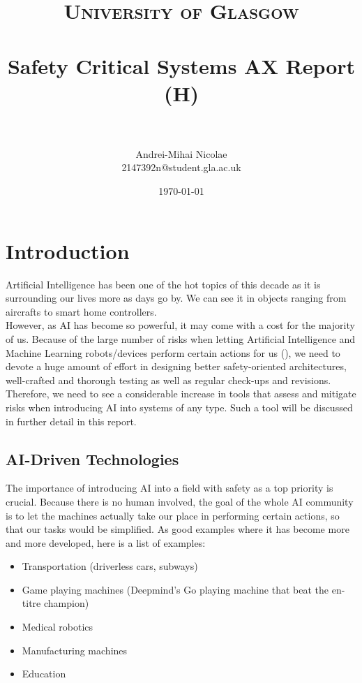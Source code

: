 \documentclass[paper=a4, fontsize=11pt]{scrartcl} %
\title{
\normalfont \normalsize
\textsc{University of Glasgow} \\ [25pt] 
\horrule{0.5pt} \\[0.4cm] %
\huge Safety Critical Systems AX Report (H)\\ 
\horrule{2pt} \\[0.5cm] %
}
\author{Andrei-Mihai Nicolae\\2147392n@student.gla.ac.uk} %
\date{\normalsize\today} %
\numberwithin{equation}{section} %
\numberwithin{figure}{section} %
\numberwithin{table}{section} %
\begin{document}
\maketitle %

\tableofcontents %


\section{Introduction}

\par
Artificial Intelligence has been one of the hot topics of this decade as it is surrounding our lives more as days go by. We can see it in objects ranging from aircrafts to smart home controllers. \\

However, as AI has become so powerful, it may come with a cost for the majority of us. Because of the large number of risks when letting Artificial Intelligence and Machine Learning robots/devices perform certain actions for us (\cite{ai-risks}), we need to devote a huge amount of effort in designing better safety-oriented architectures, well-crafted and thorough testing as well as regular check-ups and revisions. Therefore, we need to see a considerable increase in tools that assess and mitigate risks when introducing AI into systems of any type. Such a tool will be discussed in further detail in this report.


\subsection{AI-Driven Technologies}

\par
The importance of introducing AI into a field with safety as a top priority is crucial. Because there is no human involved, the goal of the whole AI community is to let the machines actually take our place in performing certain actions, so that our tasks would be simplified. As good examples where it has become more and more developed, here is a list of examples:

\begin{itemize}
	\item Transportation (driverless cars, subways)
	\item Game playing machines (Deepmind's Go playing machine that beat the en-titre champion) \cite{deepmind}
	\item Medical robotics
	\item Manufacturing machines
	\item Education
\end{itemize}
\end{document}

